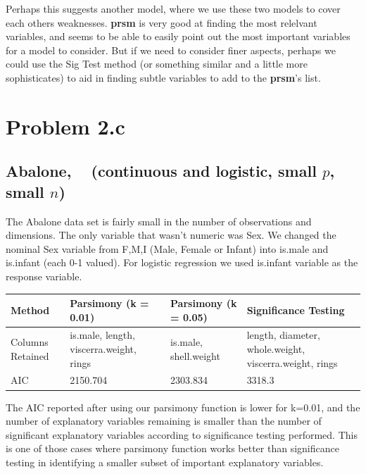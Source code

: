 \documentclass[letter]{article}
\begin{document}
Perhaps this suggests another model, where we use these two models to cover each others weaknesses. \textbf{prsm} is very good at finding the most relelvant variables, and seems to be able to easily point out the most important variables for a model to consider. But if we need to consider finer aspects, perhaps we could use the Sig Test method (or something similar and a little more sophisticates) to aid in finding subtle variables to add to the \textbf{prsm}'s list.



\section*{Problem 2.c}

\subsection*{Abalone, ~\cite{abalone} (continuous and logistic, small $p$, small $n$)}

The Abalone data set is fairly small in the number of observations and dimensions. The only variable that wasn't numeric was Sex. We changed the nominal Sex variable from F,M,I (Male, Female or Infant) into is.male and is.infant (each 0-1 valued). For logistic regression we used is.infant variable as the response variable.

\begin{center}
    \begin{tabular}{ | l |  p{4cm} |  p{4cm} | p{4cm} |}
    \hline
    Method & Parsimony (k = 0.01) & Parsimony (k = 0.05) & Significance Testing \\ \hline
    	
    Columns Retained & is.male, length, viscerra.weight, rings & is.male, shell.weight & length, diameter, whole.weight, viscerra.weight, rings\\ \hline
    
    AIC & 2150.704 & 2303.834 & 3318.3\\ \hline
    
    \end{tabular}
\end{center}

The AIC reported after using our parsimony function is lower for k=0.01, and the number of explanatory variables remaining is smaller than the number of significant explanatory variables according to significance testing performed. This is one of those cases where parsimony function works better than significance testing in identifying a smaller subset of important explanatory variables.
\end{document}
